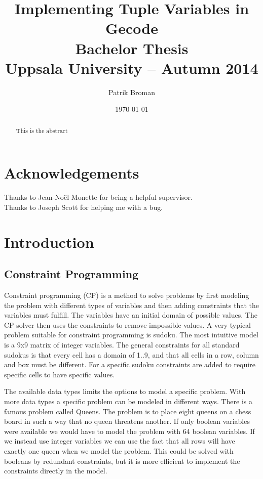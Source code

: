 \documentclass[a4paper,11pt]{article}
\title{\textbf{Implementing Tuple Variables in Gecode \\
	Bachelor Thesis \\
    Uppsala University -- Autumn 2014 \\
  }
}
\author{Patrik Broman}
\date{\today}
\begin{document}
\maketitle

\begin{abstract}
This is the abstract
\end{abstract}

\tableofcontents
\section{Acknowledgements}
Thanks to Jean-Noël Monette for being a helpful supervisor. \\
Thanks to Joseph Scott for helping me with a bug. \\
\section{Introduction}
\subsection{Constraint Programming}

Constraint programming (CP) is a method to solve problems by first modeling the problem with different types of variables and then adding constraints that the variables must fulfill. The variables have an initial domain of possible values. The CP solver then uses the constraints to remove impossible values. A very typical problem suitable for constraint programming is sudoku. The most intuitive model is a 9x9 matrix of integer variables. The general constraints for all standard sudokus is that every cell has a domain of 1..9, and that all cells in a row, column and box must be different. For a specific sudoku constraints are added to require specific cells to have specific values.

The available data types limits the options to model a specific problem. With more data types a specific problem can be modeled in different ways. There is a famous problem called Queens. The problem is to place eight queens on a chess board in such a way that no queen threatens another. If only boolean variables were available we would have to model the problem with 64 boolean variables. If we instead use integer variables we can use the fact that all rows will have exactly one queen when we model the problem. This could be solved with booleans by redundant constraints, but it is more efficient to implement the constraints directly in the model.
\end{document}
